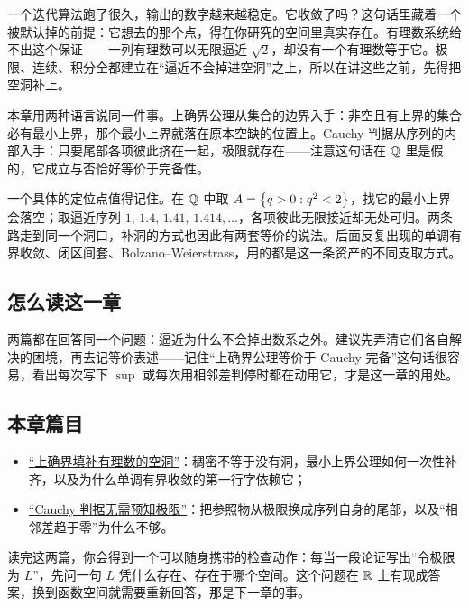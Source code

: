 一个迭代算法跑了很久，输出的数字越来越稳定。它收敛了吗？这句话里藏着一个被默认掉的前提：它想去的那个点，得在你研究的空间里真实存在。有理数系统给不出这个保证——一列有理数可以无限逼近 \(\sqrt2\)，却没有一个有理数等于它。极限、连续、积分全都建立在``逼近不会掉进空洞''之上，所以在讲这些之前，先得把空洞补上。

本章用两种语言说同一件事。上确界公理从集合的边界入手：非空且有上界的集合必有最小上界，那个最小上界就落在原本空缺的位置上。Cauchy 判据从序列的内部入手：只要尾部各项彼此挤在一起，极限就存在——注意这句话在 \(\mathbb{Q}\) 里是假的，它成立与否恰好等价于完备性。

一个具体的定位点值得记住。在 \(\mathbb{Q}\) 中取 \(A=\left\{q>0:q^2<2\right\}\)，找它的最小上界会落空；取逼近序列 \(1,\,1.4,\,1.41,\,1.414,\ldots\)，各项彼此无限接近却无处可归。两条路走到同一个洞口，补洞的方式也因此有两套等价的说法。后面反复出现的单调有界收敛、闭区间套、Bolzano--Weierstrass，用的都是这一条资产的不同支取方式。

\subsection{怎么读这一章}

两篇都在回答同一个问题：逼近为什么不会掉出数系之外。建议先弄清它们各自解决的困境，再去记等价表述——记住``上确界公理等价于 Cauchy 完备''这句话很容易，看出每次写下 \(\sup\) 或每次用相邻差判停时都在动用它，才是这一章的用处。

\subsection{本章篇目}

\begin{itemize}
\tightlist
\item \hyperref[sec:12-Real-Analysis-Support/01-Real-Numbers-and-Completeness/01]{``上确界填补有理数的空洞''}：稠密不等于没有洞，最小上界公理如何一次性补齐，以及为什么单调有界收敛的第一行字依赖它；
\item \hyperref[sec:12-Real-Analysis-Support/01-Real-Numbers-and-Completeness/02]{``Cauchy 判据无需预知极限''}：把参照物从极限换成序列自身的尾部，以及``相邻差趋于零''为什么不够。
\end{itemize}

读完这两篇，你会得到一个可以随身携带的检查动作：每当一段论证写出``令极限为 \(L\)''，先问一句 \(L\) 凭什么存在、存在于哪个空间。这个问题在 \(\mathbb{R}\) 上有现成答案，换到函数空间就需要重新回答，那是下一章的事。
